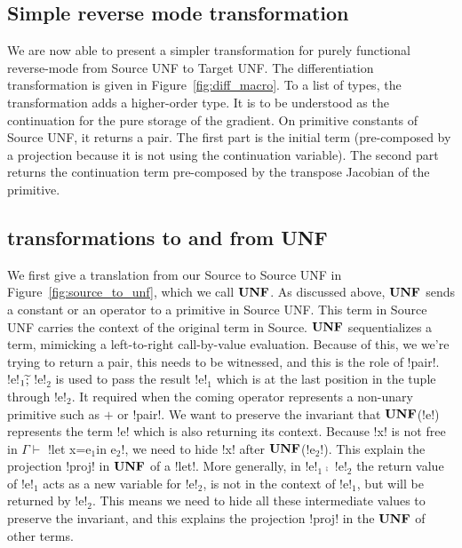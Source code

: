



\subsection{Simple reverse mode transformation} %
\label{sub:Simple reverse mode transformation}

We are now able to present a simpler transformation for purely functional reverse-mode from Source UNF to Target UNF.
The differentiation transformation is given in Figure~\ref{fig:diff_macro}.
To a list of types, the transformation adds a higher-order type. 
It is to be understood as the continuation for the pure storage of the gradient.
On primitive constants of Source UNF, it returns a pair. 
The first part is the initial term (pre-composed by a projection because it is not using the continuation variable).
The second part returns the continuation term pre-composed by the transpose Jacobian of the primitive.



\subsection{transformations to and from UNF} %
\label{sub:transformations to and from UNF}

We first give a translation from our Source to Source UNF in Figure~\ref{fig:source_to_unf}, which we call $\mathbf{UNF}$.
As discussed above, $\mathbf{UNF}$ sends a constant or an operator to a primitive in Source UNF. 
This term in Source UNF carries the context of the original term in Source.
$\mathbf{UNF}$ sequentializes a term, mimicking a left-to-right call-by-value evaluation.
Because of this, we we're trying to return a pair, this needs to be witnessed, and this is the role of !pair!.
!e!$_{1} \widetilde{;}$ !e!$_{2}$  is used to pass the result !e!$_{1}$ which is at the last position in the tuple through !e!$_{2}$.
It required when the coming operator represents a non-unary primitive such as $+$ or !pair!.
We want to preserve the invariant that $\mathbf{UNF}$(!e!) represents the term !e! which is also returning its context. 
Because !x! is not free in $\Gamma \vdash$ !let x=e$_1$in e$_2$!, we need to hide !x! after $\mathbf{UNF}$(!e$_2$!).
This explain the projection !proj! in $\mathbf{UNF}$ of a !let!. 
More generally, in !e!$_{1} \comp$ !e!$_{2}$ the return value of !e!$_{1}$ acts as a new variable for !e!$_{2}$, 
is not in the context of !e!$_{1}$, but will be returned by !e!$_{2}$.
This means we need to hide all these intermediate values to preserve the invariant,
and this explains the projection !proj! in the $\mathbf{UNF}$ of other terms. 

